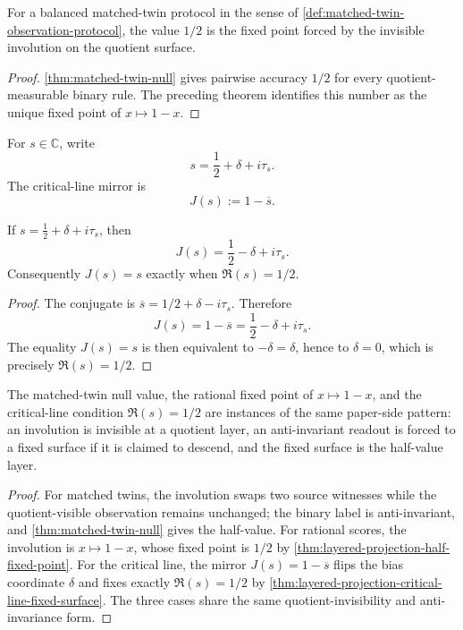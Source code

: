 \begin{corollary}
\label{cor:layered-projection-matched-twin-half-value}
For a balanced matched-twin protocol in the sense of
\autoref{def:matched-twin-observation-protocol}, the value $1/2$ is the
fixed point forced by the invisible involution on the quotient surface.
\end{corollary}

\begin{proof}
\autoref{thm:matched-twin-null} gives pairwise accuracy $1/2$ for every
quotient-measurable binary rule. The preceding theorem identifies this
number as the unique fixed point of $x\mapsto1-x$.
\end{proof}

\begin{definition}
\label{def:layered-projection-critical-line-mirror}
For $s\in\mathbb C$, write
$$
s=\frac12+\delta+i\tau_s.
$$
The critical-line mirror is
$$
J(s):=1-\overline{s}.
$$
\end{definition}

\begin{theorem}
\label{thm:layered-projection-critical-line-fixed-surface}
If $s=\frac12+\delta+i\tau_s$, then
$$
J(s)=\frac12-\delta+i\tau_s.
$$
Consequently $J(s)=s$ exactly when $\Re(s)=1/2$.
\end{theorem}

\begin{proof}
The conjugate is $\overline{s}=1/2+\delta-i\tau_s$. Therefore
$$
J(s)=1-\overline{s}=\frac12-\delta+i\tau_s.
$$
The equality $J(s)=s$ is then equivalent to $-\delta=\delta$, hence to
$\delta=0$, which is precisely $\Re(s)=1/2$.
\end{proof}

\begin{theorem}
\label{thm:layered-projection-symmetric-half-value-unification}
The matched-twin null value, the rational fixed point of $x\mapsto1-x$,
and the critical-line condition $\Re(s)=1/2$ are instances of the same
paper-side pattern: an involution is invisible at a quotient layer, an
anti-invariant readout is forced to a fixed surface if it is claimed to
descend, and the fixed surface is the half-value layer.
\end{theorem}

\begin{proof}
For matched twins, the involution swaps two source witnesses while the
quotient-visible observation remains unchanged; the binary label is
anti-invariant, and \autoref{thm:matched-twin-null} gives the half-value.
For rational scores, the involution is $x\mapsto1-x$, whose fixed point
is $1/2$ by \autoref{thm:layered-projection-half-fixed-point}. For the
critical line, the mirror $J(s)=1-\overline{s}$ flips the bias coordinate
$\delta$ and fixes exactly $\Re(s)=1/2$ by
\autoref{thm:layered-projection-critical-line-fixed-surface}. The three
cases share the same quotient-invisibility and anti-invariance form.
\end{proof}

